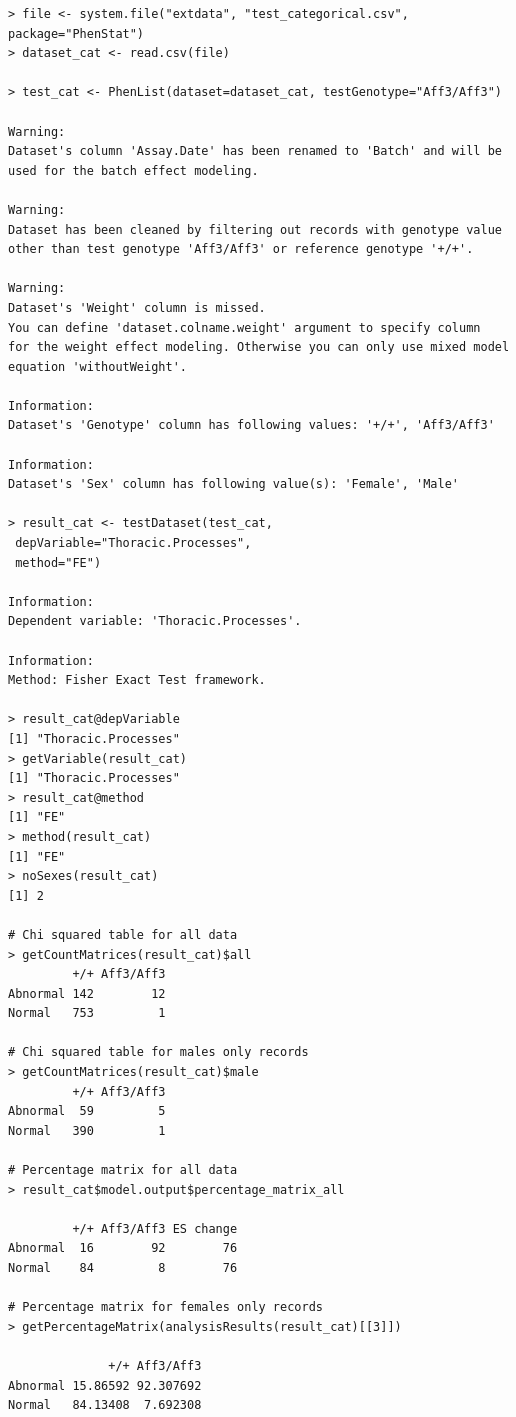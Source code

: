 \documentclass[12pt,a4paper]{article}
\begin{document}
\begingroup
\fontsize{8pt}{12pt}\selectfont
\begin{verbatim}
> file <- system.file("extdata", "test_categorical.csv", package="PhenStat") 
> dataset_cat <- read.csv(file)

> test_cat <- PhenList(dataset=dataset_cat, testGenotype="Aff3/Aff3")
 
Warning:
Dataset's column 'Assay.Date' has been renamed to 'Batch' and will be used for the batch effect modeling.

Warning:
Dataset has been cleaned by filtering out records with genotype value 
other than test genotype 'Aff3/Aff3' or reference genotype '+/+'.

Warning:
Dataset's 'Weight' column is missed.
You can define 'dataset.colname.weight' argument to specify column 
for the weight effect modeling. Otherwise you can only use mixed model equation 'withoutWeight'.

Information:
Dataset's 'Genotype' column has following values: '+/+', 'Aff3/Aff3'

Information:
Dataset's 'Sex' column has following value(s): 'Female', 'Male'

> result_cat <- testDataset(test_cat,
 depVariable="Thoracic.Processes",
 method="FE")

Information:
Dependent variable: 'Thoracic.Processes'.

Information:
Method: Fisher Exact Test framework.

> result_cat@depVariable
[1] "Thoracic.Processes"
> getVariable(result_cat)
[1] "Thoracic.Processes"
> result_cat@method
[1] "FE"
> method(result_cat)
[1] "FE"
> noSexes(result_cat)
[1] 2

# Chi squared table for all data
> getCountMatrices(result_cat)$all
         +/+ Aff3/Aff3
Abnormal 142        12
Normal   753         1

# Chi squared table for males only records
> getCountMatrices(result_cat)$male
         +/+ Aff3/Aff3
Abnormal  59         5
Normal   390         1

# Percentage matrix for all data
> result_cat$model.output$percentage_matrix_all

         +/+ Aff3/Aff3 ES change
Abnormal  16        92        76
Normal    84         8        76

# Percentage matrix for females only records
> getPercentageMatrix(analysisResults(result_cat)[[3]])

              +/+ Aff3/Aff3
Abnormal 15.86592 92.307692
Normal   84.13408  7.692308


\end{verbatim}
\end{document}
